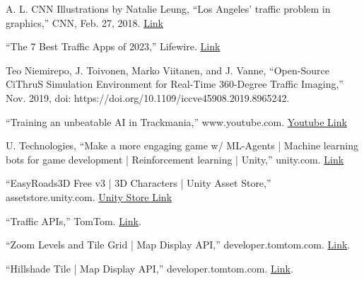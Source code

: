 \documentclass[a4paper,10pt]{article}
\begin{document}
    \begin{thebibliography}{}

         A. L. CNN Illustrations by Natalie Leung, ``Los Angeles' traffic problem in graphics,'' CNN, Feb. 27, 2018. \href{https://www.cnn.com/2018/02/27/americas/los-angeles-traffic/index.html}{Link}

         “The 7 Best Traffic Apps of 2023,” Lifewire. \href{https://www.lifewire.com/best-traffic-apps-4570916}{Link}

         Teo Niemirepo, J. Toivonen, Marko Viitanen, and J. Vanne, “Open-Source CiThruS Simulation Environment for Real-Time 360-Degree Traffic Imaging,” Nov. 2019, doi: https://doi.org/10.1109/iccve45908.2019.8965242.

         “Training an unbeatable AI in Trackmania,” www.youtube.com. \href{https://www.youtube.com/watch?v=Dw3BZ6O_8LY}{Youtube Link}

         U. Technologies, “Make a more engaging game w/ ML-Agents | Machine learning bots for game development | Reinforcement learning | Unity,” unity.com. \href{https://unity.com/products/machine-learning-agents}{Link}

         “EasyRoads3D Free v3 | 3D Characters | Unity Asset Store,” assetstore.unity.com. \href{https://assetstore.unity.com/packages/3d/characters/easyroads3d-free-v3-987}{Unity Store Link}

         “Traffic APIs,” TomTom. \href{https://www.tomtom.com/products/traffic-apis/}{Link}.

         “Zoom Levels and Tile Grid | Map Display API,” developer.tomtom.com. \href{https://developer.tomtom.com/map-display-api/documentation/zoom-levels-and-tile-grid}{Link}.

         “Hillshade Tile | Map Display API,” developer.tomtom.com. \href{https://developer.tomtom.com/map-display-api/documentation/raster/hillshade-tile}{Link}.

    \end{thebibliography}
\end{document}
